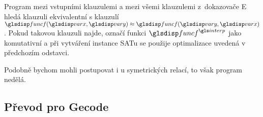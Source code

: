 Program \crossbow{} mezi vstupními klauzulemi a mezi všemi
klauzulemi z~dokazovače E hledá klauzuli ekvivalentní
s klauzulí $\func(\var, \varY) \approx \func(\varY, \var)$.
Pokud takovou klauzuli najde, označí funkci $\func^\interp$
jako komutativní a při vytváření instance SATu se použije
optimalizace uvedená v předchozím odstavci.

Podobně bychom mohli postupovat i u symetrických relací,
to však program \crossbow{} nedělá.

\subsection{Převod pro Gecode}

\newcommand\Eq{\textproc{Eq}}
\newcommand\Element{\textproc{Element}}
\newcommand\Linear{\textproc{Linear}}

